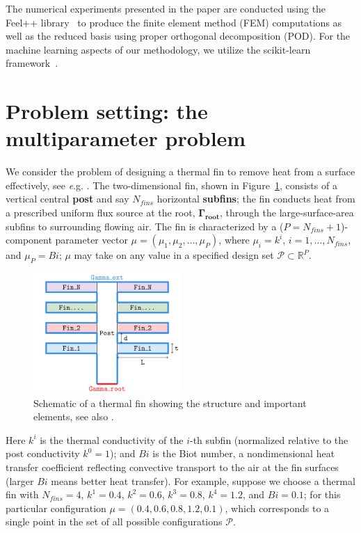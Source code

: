 \documentclass[graybox]{svmult}
\begin{document}
The numerical experiments presented in the paper are conducted using the Feel++ library~\cite{feelpp} to produce the finite element method (FEM) computations as well as the reduced basis using proper orthogonal decomposition (POD). For the machine learning aspects of our methodology, we utilize the scikit-learn framework~\cite{sklearn}. 



\section{Problem setting: the multiparameter problem}
\label{sec:2}
We consider the problem of designing a thermal fin to remove heat from a surface effectively, see {\emph e.g.} \cite{rbpp}. The two-dimensional fin, shown in Figure~\ref{fig:thermal-fin}, consists of a vertical central \textbf{post} and say $N_{fins}$ horizontal \textbf{subfins}; the fin conducts heat from a prescribed uniform flux source at the root, $\mathbf{\Gamma_{\text{root}}}$, through the large-surface-area subfins to surrounding flowing air. The fin is characterized by a ($P=N_{fins}+1$)-component parameter vector $\mu = (\mu_1, \mu_2, \ldots, \mu_{P})$, where $\mu_i = k^i$, $i = 1, \ldots, N_{fins}$, and $\mu_{P} = Bi$; $\mu$ may take on any value in a specified design set $\mathcal{P} \subset \mathbb{R}^{P}$.

\begin{figure}[htbp]
\centering
\includegraphics[width=0.5\textwidth]{thermal-fin.png}
\caption{Schematic of a thermal fin showing the structure and important elements, see also \cite{rbpp}.}
\label{fig:thermal-fin}
\end{figure}
Here $k^i$ is the thermal conductivity of the $i$-th subfin (normalized relative to the post conductivity $k^0 = 1$); and $Bi$ is the Biot number, a nondimensional heat transfer coefficient reflecting convective transport to the air at the fin surfaces (larger $Bi$ means better heat transfer). For example, suppose we choose a thermal fin with $N_{fins}=4$, $k^1 = 0.4$, $k^2 = 0.6$, $k^3 = 0.8$, $k^4 = 1.2$, and $Bi = 0.1$; for this particular configuration $\mu = (0.4, 0.6, 0.8, 1.2, 0.1)$, which corresponds to a single point in the set of all possible configurations $\mathcal{P}$. 
\end{document}
